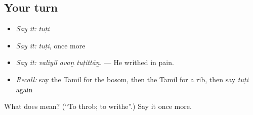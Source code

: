 \subsection*{Your turn}
\begin{itemize}
\raggedright
  \item \emph{Say it:} \emph{tuṭi}
  \item \emph{Say it:} \emph{tuṭi}, once more
  \item \emph{Say it:} \emph{valiyil avaṉ tuṭittāṉ.} — He writhed in pain.
  \item \emph{Recall:} say the Tamil for the bosom, then the Tamil for a rib, then say \emph{tuṭi} again
\end{itemize}

\begin{tcolorbox}[breakable,colback=teal!4,colframe=teal!35!black,title={Before you move on}]
What does  mean? (\textquotedblleft{}To throb; to writhe\textquotedblright{}.) Say it once more.
\end{tcolorbox}
